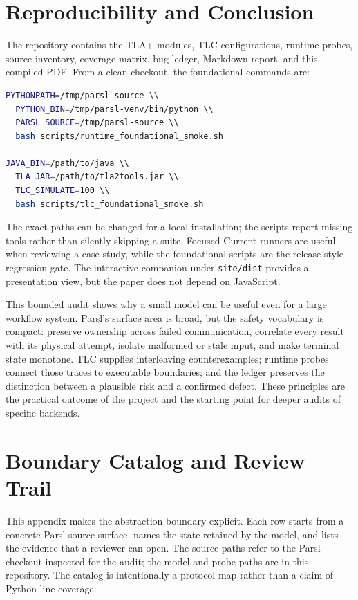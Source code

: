 \documentclass[11pt,a4paper]{article}
\begin{document}
\section{Reproducibility and Conclusion}
The repository contains the TLA+ modules, TLC configurations, runtime probes, source inventory,
coverage matrix, bug ledger, Markdown report, and this compiled PDF. From a clean checkout, the
foundational commands are:

\begin{lstlisting}[language=bash]
PYTHONPATH=/tmp/parsl-source \\
  PYTHON_BIN=/tmp/parsl-venv/bin/python \\
  PARSL_SOURCE=/tmp/parsl-source \\
  bash scripts/runtime_foundational_smoke.sh

JAVA_BIN=/path/to/java \\
  TLA_JAR=/path/to/tla2tools.jar \\
  TLC_SIMULATE=100 \\
  bash scripts/tlc_foundational_smoke.sh
\end{lstlisting}

The exact paths can be changed for a local installation; the scripts report missing tools rather
than silently skipping a suite. Focused Current runners are useful when reviewing a case study,
while the foundational scripts are the release-style regression gate. The interactive companion
under \texttt{site/dist} provides a presentation view, but the paper does not depend on JavaScript.

This bounded audit shows why a small model can be useful even for a large workflow system. Parsl's
surface area is broad, but the safety vocabulary is compact: preserve ownership across failed
communication, correlate every result with its physical attempt, isolate malformed or stale input,
and make terminal state monotone. TLC supplies interleaving counterexamples; runtime probes connect
those traces to executable boundaries; and the ledger preserves the distinction between a plausible
risk and a confirmed defect. These principles are the practical outcome of the project and the
starting point for deeper audits of specific backends.

\appendix
\section{Boundary Catalog and Review Trail}
\label{app:boundaries}
This appendix makes the abstraction boundary explicit. Each row starts from a concrete Parsl source
surface, names the state retained by the model, and lists the evidence that a reviewer can open. The
source paths refer to the Parsl checkout inspected for the audit; the model and probe paths are in
this repository. The catalog is intentionally a protocol map rather than a claim of Python line
coverage.
\end{document}
